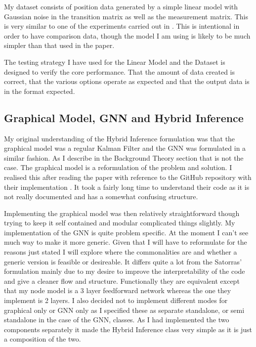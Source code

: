 \documentclass[]{../resources/final_report}
\begin{document}
My dataset consists of position data generated by a simple linear model with Gaussian noise in the 
transition matrix as well as the measurement matrix. This is very similar to one of the experiments 
carried out in \cite{Satorras2019CombiningGA}. This is intentional in order to have comparison data,
though the model I am using is likely to be much simpler than that used in the paper.

The testing strategy I have used for the Linear Model and the Dataset is designed to verify the core
performance. That the amount of data created is correct, that the various options operate as expected 
and that the output data is in the format expected.

\subsection{Graphical Model, GNN and Hybrid Inference}

My original understanding of the Hybrid Inference formulation was that the graphical model was a 
regular Kalman Filter and the GNN was formulated in a similar fashion. As I describe in the Background 
Theory section that is not the case. The graphical model is a reformulation of the problem and 
solution. I realised this after reading the paper with reference to the GitHub repository with their 
implementation \cite{vgsatorrasgithub}. It took a fairly long time to understand their code as it is 
not really documented and has a somewhat confusing structure.

Implementing the graphical model was then relatively straightforward though trying to keep it self 
contained and modular complicated things slightly. My implementation of the GNN is quite problem 
specific. At the moment I can't see much way to make it more generic. Given that I will have to 
reformulate for the reasons just stated I will explore where the commonalities are and whether a 
generic version is feasible or desireable. It differs quite a lot from the Satorras' formulation 
mainly due to my desire to improve the interpretability of the code and give a cleaner flow and 
structure. Functionally they are equivalent except that my node model is a 3 layer feedforward 
network whereas the one they implement is 2 layers. I also decided not to implement different 
modes for graphical only or GNN only as I specified these as separate standalone, or semi 
standalone in the case of the GNN, classes. As I had implemented the two components separately 
it made the Hybrid Inference class very simple as it is just a composition of the two.
\end{document}
